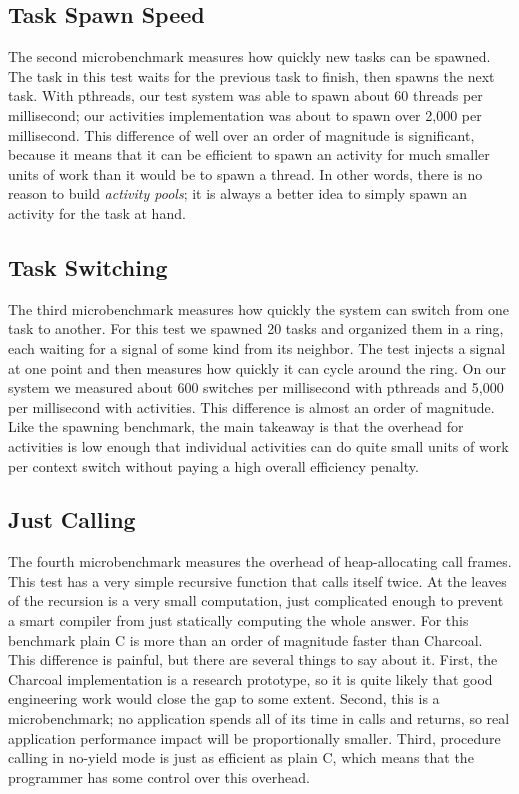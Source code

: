 \documentclass[10pt,preprint]{sigplanconf}
\begin{document}
\subsection{Task Spawn Speed}


The second microbenchmark measures how quickly new tasks can be spawned.
The task in this test waits for the previous task to finish, then spawns the next task.
With pthreads, our test system was able to spawn about 60 threads per millisecond; our activities implementation was about to spawn over 2,000 per millisecond.
This difference of well over an order of magnitude is significant, because it means that it can be efficient to spawn an activity for much smaller units of work than it would be to spawn a thread.
In other words, there is no reason to build \emph{activity pools}; it is always a better idea to simply spawn an activity for the task at hand.

\subsection{Task Switching}

The third microbenchmark measures how quickly the system can switch from one task to another.
For this test we spawned 20 tasks and organized them in a ring, each waiting for a signal of some kind from its neighbor.
The test injects a signal at one point and then measures how quickly it can cycle around the ring.
On our system we measured about 600 switches per millisecond with pthreads and 5,000 per millisecond with activities.
This difference is almost an order of magnitude.
Like the spawning benchmark, the main takeaway is that the overhead for activities is low enough that individual activities can do quite small units of work per context switch without paying a high overall efficiency penalty.

\subsection{Just Calling}


The fourth microbenchmark measures the overhead of heap-allocating call frames.
This test has a very simple recursive function that calls itself twice.
At the leaves of the recursion is a very small computation, just complicated enough to prevent a smart compiler from just statically computing the whole answer.
For this benchmark plain C is more than an order of magnitude faster than Charcoal.
This difference is painful, but there are several things to say about it.
First, the Charcoal implementation is a research prototype, so it is quite likely that good engineering work would close the gap to some extent.
Second, this is a microbenchmark; no application spends all of its time in calls and returns, so real application performance impact will be proportionally smaller.
Third, procedure calling in no-yield mode is just as efficient as plain C, which means that the programmer has some control over this overhead.
\end{document}
